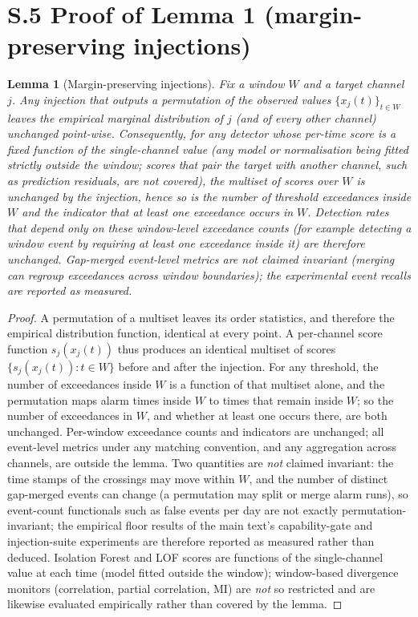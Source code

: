\documentclass[11pt,a4paper]{article}
\newtheorem*{lemma}{Lemma}
\begin{document}
\section*{S.5 Proof of Lemma 1 (margin-preserving injections)}

\begin{lemma}[Margin-preserving injections]
Fix a window $W$ and a target channel $j$. Any injection that outputs a
permutation of the observed values $\{x_j(t)\}_{t\in W}$ leaves the empirical
marginal distribution of $j$ (and of every other channel) unchanged
point-wise. Consequently, for any detector whose per-time score is a fixed function of the
single-channel value (any model or normalisation being fitted strictly
outside the window; scores that pair the target with another channel, such
as prediction residuals, are not covered), the multiset of scores over $W$ is unchanged by
the injection, hence so is the number of threshold exceedances inside $W$
and the indicator that at least one exceedance occurs in $W$. Detection rates that depend only on these window-level exceedance
counts (for example detecting a window event by requiring
at least one exceedance inside it) are therefore unchanged. Gap-merged event-level
metrics are not claimed invariant (merging can regroup exceedances across
window boundaries); the experimental event recalls are reported as measured.
\end{lemma}

\begin{proof}
A permutation of a multiset leaves its order statistics, and therefore the
empirical distribution function, identical at every point. A per-channel
score function $s_j(x_j(t))$ thus produces an identical multiset of scores
$\{s_j(x_j(t)): t\in W\}$ before and after the injection. For any threshold,
the number of exceedances inside $W$ is a function of that multiset alone,
and the permutation maps alarm times inside $W$ to times that remain inside
$W$; so the number of exceedances in $W$, and whether at least one occurs
there, are both unchanged. Per-window exceedance counts and indicators are unchanged; all
event-level metrics under any matching convention, and any aggregation
across channels, are outside the lemma.
Two quantities are \emph{not} claimed invariant: the time stamps of the
crossings may move within $W$, and the number of distinct gap-merged events
can change (a permutation may split or merge alarm runs), so event-count
functionals such as false events per day are not exactly
permutation-invariant; the empirical floor results of the main text's
capability-gate and injection-suite experiments are therefore reported as
measured rather than deduced. Isolation Forest and LOF scores are functions of the
single-channel value at each time (model fitted outside the window);
window-based divergence monitors (correlation, partial correlation, MI) are
\emph{not} so restricted and are likewise evaluated empirically rather than
covered by the lemma.
\end{proof}
\end{document}
